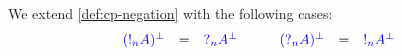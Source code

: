 \begin{definition}[Negation]\label{def:nc-negation}
  We extend \cref{def:cp-negation} with the following cases:
  \[\!
    \begin{array}{lclclcl}
              \ty{(\take[n]{A})^\bot} &=& \ty{\give[n]{A^\bot}}
      &\quad& \ty{(\give[n]{A})^\bot} &=& \ty{\take[n]{A^\bot}}
    \end{array}
  \]
\end{definition}
